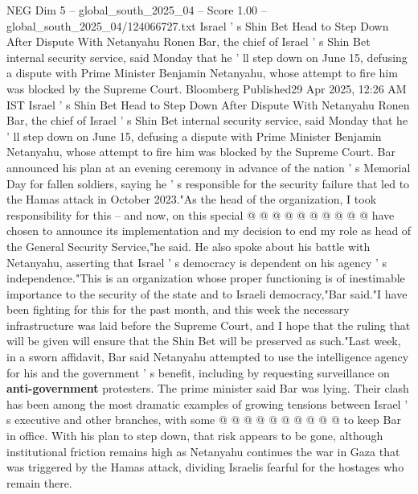 \begin{textsample}{NEG Dim 5 – global\_south\_2025\_04 – Score 1.00 – global\_south\_2025\_04/124066727.txt}  \label{ex:f5_neg_368}
Israel ' s Shin Bet Head to Step Down After Dispute With Netanyahu Ronen Bar, the chief of Israel ' s Shin Bet internal security service, said Monday that he ' ll step down on June 15, defusing a dispute with Prime Minister Benjamin Netanyahu, whose attempt to fire him was blocked by the Supreme Court.
Bloomberg Published29 Apr 2025, 12:26 AM IST Israel ' s Shin Bet Head to Step Down After Dispute With Netanyahu Ronen Bar, the chief of Israel ' s Shin Bet internal security service, said Monday that he ' ll step down on June 15, defusing a dispute with Prime Minister Benjamin Netanyahu, whose attempt to fire him was blocked by the Supreme Court.
Bar announced his plan at an evening ceremony in advance of the nation ' s Memorial Day for fallen soldiers, saying he ' s responsible for the security failure that led to the Hamas attack in October 2023."As the head of the organization, I took responsibility for this -- and now, on this special @ @ @ @ @ @ @ @ @ @ have chosen to announce its implementation and my decision to end my role as head of the General Security Service,"he said.
He also spoke about his battle with Netanyahu, asserting that Israel ' s democracy is dependent on his agency ' s independence."This is an organization whose proper functioning is of inestimable importance to the security of the state and to Israeli democracy,"Bar said."I have been fighting for this for the past month, and this week the necessary infrastructure was laid before the Supreme Court, and I hope that the ruling that will be given will ensure that the Shin Bet will be preserved as such."Last week, in a sworn affidavit, Bar said Netanyahu attempted to use the intelligence agency for his and the government ' s benefit, including by requesting surveillance on \textbf{anti-government} protesters.
The prime minister said Bar was lying.
Their clash has been among the most dramatic examples of growing tensions between Israel ' s executive and other branches, with some @ @ @ @ @ @ @ @ @ @ to keep Bar in office.
With his plan to step down, that risk appears to be gone, although institutional friction remains high as Netanyahu continues the war in Gaza that was triggered by the Hamas attack, dividing Israelis fearful for the hostages who remain there.

\end{textsample}
